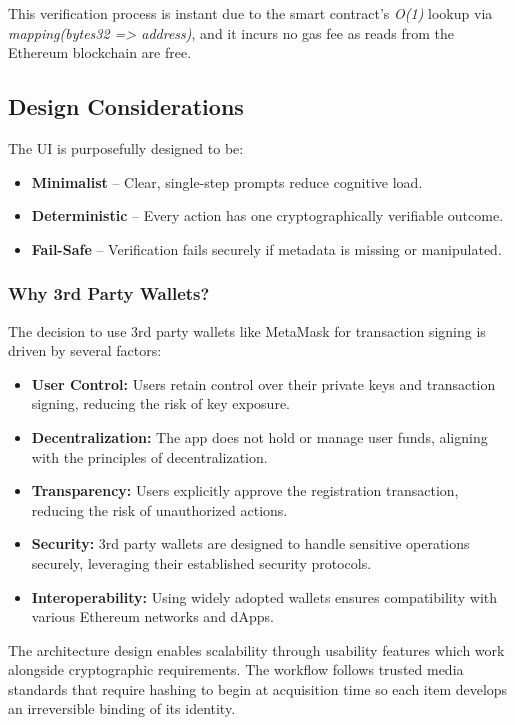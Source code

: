 This verification process is instant due to the smart contract’s \textit{O(1)} lookup via \textit{mapping(bytes32 => address)}, and it incurs no gas fee as reads from the Ethereum blockchain are free.

\subsection{Design Considerations}
The UI is purposefully designed to be:

\begin{itemize}
    \item {\textbf{Minimalist}} – Clear, single-step prompts reduce cognitive load.
    \item {\textbf{Deterministic}} – Every action has one cryptographically verifiable outcome.
    \item {\textbf{Fail-Safe}} – Verification fails securely if metadata is missing or manipulated.
\end{itemize}

\subsubsection{Why 3rd Party Wallets?}
The decision to use 3rd party wallets like MetaMask for transaction signing is driven by several factors:
\begin{itemize}
    \item {\textbf{User Control:}} Users retain control over their private keys and transaction signing, reducing the risk of key exposure.
    \item {\textbf{Decentralization:}} The app does not hold or manage user funds, aligning with the principles of decentralization.
    \item {\textbf{Transparency:}} Users explicitly approve the registration transaction, reducing the risk of unauthorized actions.
    \item {\textbf{Security:}} 3rd party wallets are designed to handle sensitive operations securely, leveraging their established security protocols.
    \item {\textbf{Interoperability:}} Using widely adopted wallets ensures compatibility with various Ethereum networks and dApps.
\end{itemize}

The architecture design enables scalability through usability features which work alongside cryptographic requirements. The workflow follows trusted media standards \cite{harran2017} that require hashing to begin at acquisition time so each item develops an irreversible binding of its identity.


